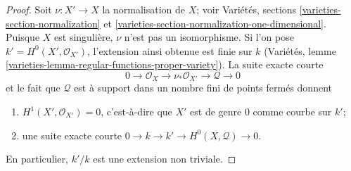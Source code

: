 \begin{proof}
Soit $\nu : X' \to X$ la normalisation de $X$; voir Variétés, sections \ref{varieties-section-normalization} et \ref{varieties-section-normalization-one-dimensional}. Puisque $X$ est singulière, $\nu$ n'est pas un isomorphisme. Si l'on pose $k' = H^0(X', \mathcal{O}_{X'})$, l'extension ainsi obtenue est finie sur $k$ (Variétés, lemme \ref{varieties-lemma-regular-functions-proper-variety}). La suite exacte courte $$
0 \to \mathcal{O}_X \to \nu_*\mathcal{O}_{X'} \to \mathcal{Q} \to 0
$$ et le fait que $\mathcal{Q}$ est à support dans un nombre fini de points fermés donnent \begin{enumerate} \item $H^1(X', \mathcal{O}_{X'}) = 0$, c'est-à-dire que $X'$ est de genre $0$ comme courbe sur $k'$; \item une suite exacte courte $0 \to k \to k' \to H^0(X, \mathcal{Q}) \to 0$. \end{enumerate} En particulier, $k'/k$ est une extension non triviale.


\end{proof}
